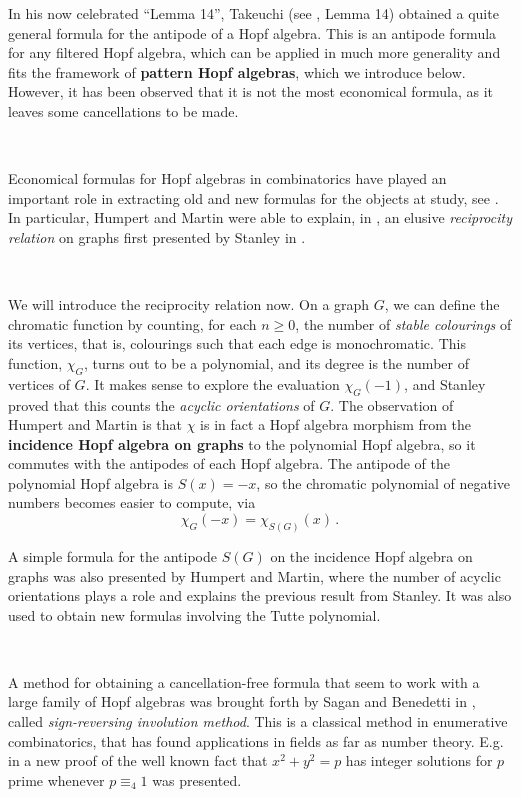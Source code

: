 \documentclass[12pt, reqno]{amsart}
\theoremstyle{definition}
\begin{document}
In his now celebrated  ``Lemma 14'', Takeuchi (see \cite{Takeuchi1971}, Lemma 14) obtained a quite general formula for the antipode of a Hopf algebra. 
This is an antipode formula for any filtered Hopf algebra, which can be applied in much more generality and fits the framework of \textbf{pattern Hopf algebras}, which we introduce below.
However, it has been observed that it is not the most economical formula, as it leaves some cancellations to be made.

\

Economical formulas for Hopf algebras in combinatorics have played an important role in extracting old and new formulas for the objects at study, see \cite{Schmitt1993, humpert2012incidence, BS2017, aguiar2017hopf, xu2022cancellation}.
In particular, Humpert and Martin were able to explain, in \cite{humpert2012incidence}, an elusive \textit{reciprocity relation} on graphs first presented by Stanley in \cite{stanley1975combinatorial}.

\

We will introduce the reciprocity relation now.
On a graph $G$, we can define the chromatic function by counting, for each $n\geq 0$, the number of \textit{stable colourings} of its vertices, that is, colourings such that each edge is monochromatic.
This function, $\chi_G$, turns out to be a polynomial, and its degree is the number of vertices of $G$.
It makes sense to explore the evaluation $\chi_G(-1)$, and Stanley proved that this counts the \textit{acyclic orientations} of $G$.
The observation of Humpert and Martin is that $\chi$ is in fact a Hopf algebra morphism from the \textbf{incidence Hopf algebra on graphs} to the polynomial Hopf algebra, so it commutes with the antipodes of each Hopf algebra.
The antipode of the polynomial Hopf algebra is $S(x) = -x$, so the chromatic polynomial of negative numbers becomes easier to compute, via
$$\chi_G(-x) = \chi_{S(G)}(x)\, .$$

A simple formula for the antipode $S(G)$ on the incidence Hopf algebra on graphs was also presented by Humpert and Martin, where the number of acyclic orientations plays a role and explains the previous result from Stanley.
It was also used to obtain new formulas involving the Tutte polynomial.

\

A method for obtaining a cancellation-free formula that seem to work with a large family of Hopf algebras was brought forth by Sagan and Benedetti in \cite{BS2017}, called \textit{sign-reversing involution method}.
This is a classical method in enumerative combinatorics, that has found applications in fields as far as number theory. 
E.g. in \cite{zagier2009one} a new proof of the well known fact that $x^2+y^2 = p$ has integer solutions for $p$ prime whenever $p\equiv_4 1$ was presented.
\end{document}
